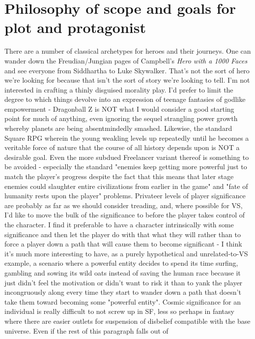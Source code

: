 \section{Philosophy of scope and goals for plot and protagonist}
\label{sec:plottingphilosophy}
There are a number of classical archetypes for heroes and their
journeys. One can wander down the Freudian/Jungian pages of Campbell's
{\em Hero with a 1000 Faces} and see everyone from Siddhartha to Luke
Skywalker.  That's not the sort of hero we're looking for because that
isn't the sort of story we're looking to tell. I'm not interested in
crafting a thinly disguised morality play. I'd prefer to limit the
degree to which things devolve into an expression of teenage fantasies
of godlike empowerment - Dragonball Z is NOT what I would consider a
good starting point for much of anything, even ignoring the sequel
strangling power growth whereby planets are being absentmindedly
smashed. Likewise, the standard Square RPG wherein the young weakling
levels up repeatedly until he becomes a veritable force of nature that
the course of all history depends upon is NOT a desirable goal. Even
the more subdued Freelancer variant thereof is something to be avoided
- especially the standard "enemies keep getting more powerful just to
match the player's progress despite the fact that this means that
later stage enemies could slaughter entire civilizations from earlier
in the game" and "fate of humanity rests upon the player"
problems. Privateer levels of player significance are probably as far
as we should consider treading, and, where possible for VS, I'd like
to move the bulk of the significance to before the player takes
control of the character. I find it preferable to have a character
intrinsically with some significance and then let the player do with
that what they will rather than to force a player down a path that
will cause them to become significant - I think it's much more
interesting to have, as a purely hypothetical and unrelated-to-VS
example, a scenario where a powerful entity decides to spend its time
surfing, gambling and sowing its wild oats instead of saving the human
race because it just didn't feel the motivation or didn't want to risk
it than to yank the player incongruously along every time they start
to wander down a path that doesn't take them toward becoming some
"powerful entity". Cosmic significance for an individual is really
difficult to not screw up in SF, less so perhaps in fantasy where
there are easier outlets for suspension of disbelief compatible with
the base universe. Even if the rest of this paragraph falls out of

